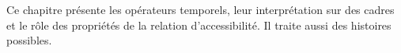 \documentclass[../../../include/open-logic-chapter]{subfiles}
\begin{document}

Ce chapitre présente les opérateurs temporels, leur interprétation
sur des cadres et le rôle des propriétés de la relation d'accessibilité.
Il traite aussi des histoires possibles.


\OLEndChapterHook
\end{document}
